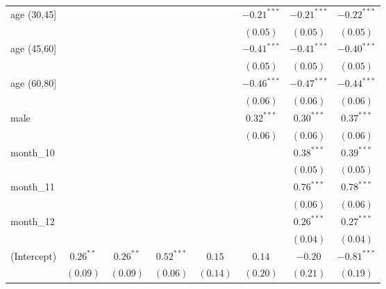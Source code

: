 \begin{table}
\begin{center}
\begin{tabular}{l c c c c c c c}
age (30,45]    &              &              &              &              & $-0.21^{***}$ & $-0.21^{***}$ & $-0.22^{***}$ \\
               &              &              &              &              & $(0.05)$      & $(0.05)$      & $(0.05)$      \\
age (45,60]    &              &              &              &              & $-0.41^{***}$ & $-0.41^{***}$ & $-0.40^{***}$ \\
               &              &              &              &              & $(0.05)$      & $(0.05)$      & $(0.05)$      \\
age (60,80]    &              &              &              &              & $-0.46^{***}$ & $-0.47^{***}$ & $-0.44^{***}$ \\
               &              &              &              &              & $(0.06)$      & $(0.06)$      & $(0.06)$      \\
male           &              &              &              &              & $0.32^{***}$  & $0.30^{***}$  & $0.37^{***}$  \\
               &              &              &              &              & $(0.06)$      & $(0.06)$      & $(0.06)$      \\
month\_10      &              &              &              &              &               & $0.38^{***}$  & $0.39^{***}$  \\
               &              &              &              &              &               & $(0.05)$      & $(0.05)$      \\
month\_11      &              &              &              &              &               & $0.76^{***}$  & $0.78^{***}$  \\
               &              &              &              &              &               & $(0.06)$      & $(0.06)$      \\
month\_12      &              &              &              &              &               & $0.26^{***}$  & $0.27^{***}$  \\
               &              &              &              &              &               & $(0.04)$      & $(0.04)$      \\
(Intercept)    & $0.26^{**}$  & $0.26^{**}$  & $0.52^{***}$ & $0.15$       & $0.14$        & $-0.20$       & $-0.81^{***}$ \\
               & $(0.09)$     & $(0.09)$     & $(0.06)$     & $(0.14)$     & $(0.20)$      & $(0.21)$      & $(0.19)$      \\

\end{tabular}
\end{center}
\end{table}
